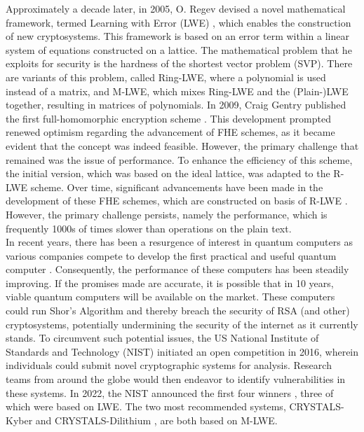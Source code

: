 Approximately a decade later, in 2005, O. Regev devised a novel mathematical framework, termed Learning with Error (LWE) \cite{Regev2005OnLL}, which enables the construction of new cryptosystems. This framework is based on an error term within a linear system of equations constructed on a lattice. The mathematical problem that he exploits for security is the hardness of the shortest vector problem (SVP). There are variants of this problem, called Ring-LWE, where a polynomial is used instead of a matrix, and M-LWE, which mixes Ring-LWE and the (Plain-)LWE together, resulting in matrices of polynomials. In 2009, Craig Gentry published the first full-homomorphic encryption scheme \cite{Gentry2009AFH}. This development prompted renewed optimism regarding the advancement of FHE schemes, as it became evident that the concept was indeed feasible. However, the primary challenge that remained was the issue of performance. To enhance the efficiency of this scheme, the initial version, which was based on the ideal lattice, was adapted to the R-LWE scheme. Over time, significant advancements have been made in the development of these FHE schemes, which are constructed on basis of R-LWE \cite{FHESurvey}. However, the primary challenge persists, namely the performance, which is frequently 1000s of times slower than operations on the plain text.\\
In recent years, there has been a resurgence of interest in quantum computers as various companies compete to develop the first practical and useful quantum computer \cite{googleQuantumComputing} \cite{ibmQuantumComputing}. Consequently, the performance of these computers has been steadily improving. If the promises made are accurate, it is possible that in 10 years, viable quantum computers will be available on the market. These computers could run Shor's Algorithm and thereby breach the security of RSA (and other) cryptosystems, potentially undermining the security of the internet as it currently stands. To circumvent such potential issues, the US National Institute of Standards and Technology (NIST) initiated an open competition in 2016, wherein individuals could submit novel cryptographic systems for analysis. Research teams from around the globe would then endeavor to identify vulnerabilities in these systems. In 2022, the NIST announced the first four winners \cite{nistAnouncement}, three of which were based on LWE. The two most recommended systems, CRYSTALS-Kyber \cite{CyrstalsKyber} and CRYSTALS-Dilithium \cite{crystalsDilithium}, are both based on M-LWE.


